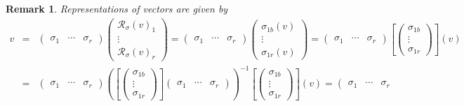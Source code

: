 \documentclass[aps,preprint]{revtex4}
\newtheorem{remark}[theorem]{Remark}
\begin{document}
\begin{remark}
Representations of vectors are given by 
\begin{eqnarray}
v &=&\left( 
\begin{array}{ccc}
\sigma _{1} & \cdots & \sigma _{r}%
\end{array}%
\right) \left( 
\begin{array}{c}
\mathcal{R}_{\sigma }\left( v\right) _{1} \\ 
\vdots \\ 
\mathcal{R}_{\sigma }\left( v\right) _{r}%
\end{array}%
\right) =\left( 
\begin{array}{ccc}
\sigma _{1} & \cdots & \sigma _{r}%
\end{array}%
\right) \left( 
\begin{array}{c}
\sigma _{1b}\left( v\right) \\ 
\vdots \\ 
\sigma _{1r}\left( v\right)%
\end{array}%
\right) =\left( 
\begin{array}{ccc}
\sigma _{1} & \cdots & \sigma _{r}%
\end{array}%
\right) \left[ \left( 
\begin{array}{c}
\sigma _{1b} \\ 
\vdots \\ 
\sigma _{1r}%
\end{array}%
\right) \right] \left( v\right) \\
&=&\left( 
\begin{array}{ccc}
\sigma _{1} & \cdots & \sigma _{r}%
\end{array}%
\right) \left( \left[ \left( 
\begin{array}{c}
\sigma _{1b} \\ 
\vdots \\ 
\sigma _{1r}%
\end{array}%
\right) \right] \left( 
\begin{array}{ccc}
\sigma _{1} & \cdots & \sigma _{r}%
\end{array}%
\right) \right) ^{-1}\left[ \left( 
\begin{array}{c}
\sigma _{1b} \\ 
\vdots \\ 
\sigma _{1r}%
\end{array}%
\right) \right] \left( v\right) =\left( 
\begin{array}{ccc}
\sigma _{1} & \cdots & \sigma _{r}%
\end{array}%

\end{eqnarray}
\end{remark}
\end{document}
